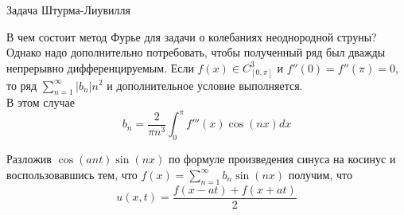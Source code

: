 \documentclass{article}
\begin{document}
\begin{section}{Задача Штурма-Лиувилля}
\begin{subsection}{В чем состоит метод Фурье для задачи о колебаниях неоднородной струны?}
Однако надо дополнительно потребовать, чтобы полученный ряд был дважды непрерывно дифференцируемым. Если $ f(x) \in C_{[0, \pi]}^3$ и $ f''(0)=f''(\pi)=0 $, то ряд $ \sum_{n=1}^{\infty} |b_n|n^2 $ и дополнительное условие выполняется.\\
В этом случае 
\[ b_n = \frac{2}{\pi n^3} \int_{0}^{\pi}f'''(x) \cos(nx)dx \]

Разложив $  \cos(ant)\sin(nx) $ по формуле произведения синуса на косинус и воспользовавшись тем, что $ f(x) = \sum_{n=1}^{\infty} b_n \sin(nx) $ получим, что
\[ u(x, t) = \frac{f(x-at) + f(x+at)}{2} \]
\end{subsection}

\end{section}
\end{document}
